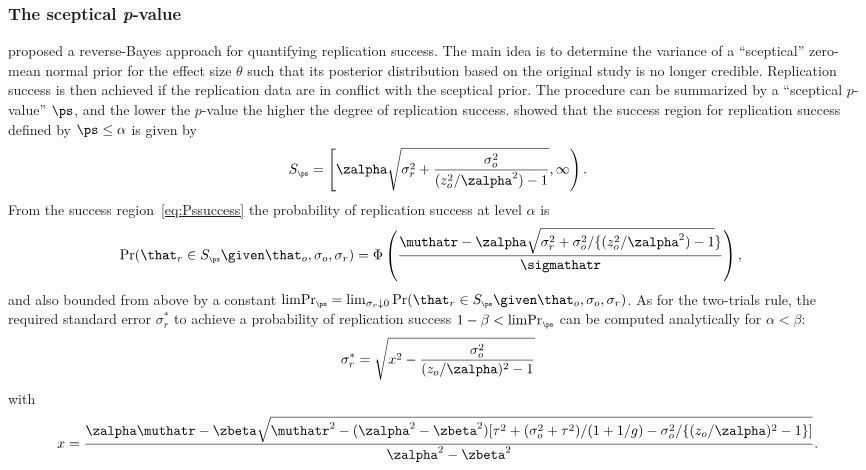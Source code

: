 \subsubsection{The sceptical \textit{p}-value}
\citet{Held2020} proposed a reverse-Bayes approach for quantifying replication
success. The main idea is to determine the variance of a ``sceptical'' zero-mean
normal prior for the effect size $\theta$ such that its posterior distribution
based on the original study is no longer credible. Replication success is then
achieved if the replication data are in conflict with the sceptical prior. The
procedure can be summarized by a ``sceptical $p$-value'' $\ps$, and the lower
the $p$-value the higher the degree of replication success. \citet[sec.
2.1]{Held2021} showed that the success region for replication success defined by
$\ps \leq \alpha$ is given by
\begin{align}
  \label{eq:Pssuccess}
  S_{\scriptscriptstyle \ps}
  = \left[\zalpha \sqrt{\sigma^{2}_{r} +
  \frac{\sigma^{2}_{o}}{(z_{o}^{2}/\zalpha^{2}) - 1}}, \infty\right).
\end{align}
From the success region~\eqref{eq:Pssuccess} the probability of replication
success at level $\alpha$ is
\begin{align*}
  \Pr(\that_r \in S_{\scriptscriptstyle \ps} \given \that_{o}, \sigma_{o}, \sigma_{r})
  &=%
     \Phi\left(\frac{\muthatr - \zalpha \sqrt{\sigma^{2}_{r} +
    \sigma^{2}_{o}/\{(z_{o}^{2}/\zalpha^{2}) - 1}\}}{\sigmathatr}\right),
\end{align*}
and also bounded from above by a constant
$\text{limPr}_{\scriptscriptstyle \ps} = \lim_{\sigma_{r} \downarrow 0} \Pr(\that_r \in S_{\scriptscriptstyle \ps} \given \that_{o}, \sigma_{o}, \sigma_{r})$.
As for the two-trials rule, the required standard error $\sigma_{r}^{*}$ to
achieve a probability of replication success
$1 - \beta < \text{limPr}_{\scriptscriptstyle \ps}$ can be computed analytically
for $\alpha < \beta$:
\begin{align*}
  \sigma_{r}^{*} = \sqrt{x^{2} - \frac{\sigma^{2}_{o}}{(z_{o}/\zalpha)^{2} - 1}}
\end{align*}
with
\begin{align*}
  x = \frac{\zalpha \muthatr - \zbeta \sqrt{\muthatr^{2} - (\zalpha^{2} - \zbeta^{2})
  [\tau^{2} + (\sigma^{2}_{o} + \tau^{2})/(1 + 1/g) - \sigma^{2}_{o}/\{(z_{o}/\zalpha)^{2}
  - 1\}]}}{\zalpha^{2} - \zbeta^{2}}.
\end{align*}


